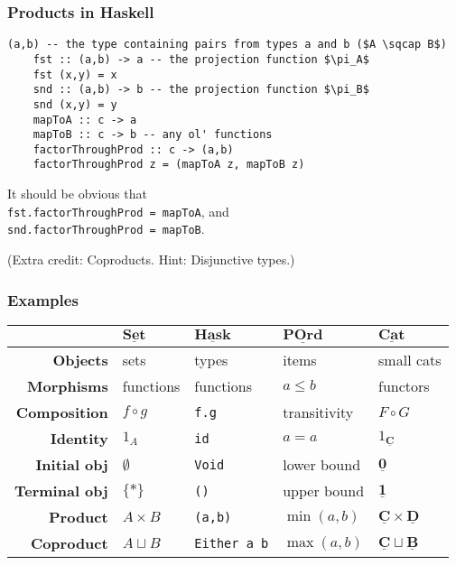 \documentclass[10pt]{beamer}
\newcommand{\Cat}[1]{\ensuremath{\underline{\mathbf{#1}}}}
\theoremstyle{definition}
\theoremstyle{remark}
\numberwithin{equation}{section}
\begin{document}
\begin{frame}[fragile]
  \frametitle{Products in Haskell}
  \begin{lstlisting}[frame=single,mathescape=true]
    (a,b) -- the type containing pairs from types a and b ($A \sqcap B$)
    fst :: (a,b) -> a -- the projection function $\pi_A$
    fst (x,y) = x
    snd :: (a,b) -> b -- the projection function $\pi_B$
    snd (x,y) = y
    mapToA :: c -> a
    mapToB :: c -> b -- any ol' functions
    factorThroughProd :: c -> (a,b)
    factorThroughProd z = (mapToA z, mapToB z)
  \end{lstlisting}

  It should be obvious that\\
  \lstinline{fst.factorThroughProd = mapToA}, and\\
  \lstinline{snd.factorThroughProd = mapToB}.
  
  {\footnotesize (Extra credit: Coproducts. Hint: Disjunctive types.)}
\end{frame}

\begin{frame}[fragile]
  \frametitle{Examples}

  \begin{center}
    \begin{tabular}{r l l l l}\toprule
    & $\Cat{Set}$ & $\Cat{Hask}$ & $\Cat{POrd}$ & $\Cat{Cat}$ \\\midrule
    \textbf{Objects} & sets & types & items & small cats \\
    \textbf{Morphisms} & functions & functions & $a \leq b$ & functors \\
    \textbf{Composition} & $f \circ g$ & \lstinline!f.g! & transitivity & $F \circ G$ \\
    \textbf{Identity} & $1_A$ & {\lstinline!id!} & $a = a$ & $1_{\Cat{C}}$ \\
    \textbf{Initial obj\rlap{.}} & $\emptyset$ & \lstinline!Void! & lower bound & $\Cat{0}$ \\
    \textbf{Terminal obj\rlap{.}} & $\{*\}$ & \lstinline!()! & upper bound & $\Cat{1}$ \\
    \textbf{Product} & $A \times B$ & \lstinline!(a,b)! & $\min(a,b)$ & $\Cat{C} \times \Cat{D}$ \\
    \textbf{Coproduct} & $A \sqcup B$ & \lstinline!Either a b! & $\max(a,b)$ & $\Cat{C} \sqcup \Cat{B}$ \\\bottomrule
  \end{tabular}
  \end{center}
\end{frame}
\end{document}
